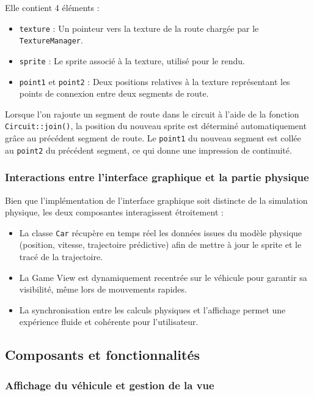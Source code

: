 Elle contient 4 éléments :
\begin{itemize}
    \item \texttt{texture} : Un pointeur vers la texture de la route chargée par le \texttt{TextureManager}.
    \item \texttt{sprite} : Le sprite associé à la texture, utilisé pour le rendu. %
    \item \texttt{point1} et \texttt{point2} : Deux positions relatives à la texture représentant les points de connexion entre deux segments de route.
\end{itemize}

Lorsque l'on rajoute un segment de route dans le circuit à l'aide de la fonction \texttt{Circuit::join()}, la position du nouveau sprite est déterminé automatiquement grâce au précédent segment de route.
Le \texttt{point1} du nouveau segment est collée au \texttt{point2} du précédent segment, ce qui donne une impression de continuité.

\subsubsection{Interactions entre l'interface graphique et la partie physique}\label{subsubsec:interactions-entre-l-interface-graphique-et-la-partie-physique}
Bien que l'implémentation de l'interface graphique soit distincte de la simulation physique, les deux composantes interagissent étroitement :
\begin{itemize}
    \item La classe \texttt{Car} récupère en temps réel les données issues du modèle physique (position, vitesse, trajectoire prédictive) afin de mettre à jour le sprite et le tracé de la trajectoire.
    \item La Game View est dynamiquement recentrée sur le véhicule pour garantir sa visibilité, même lors de mouvements rapides.
    \item La synchronisation entre les calculs physiques et l'affichage permet une expérience fluide et cohérente pour l'utilisateur.
\end{itemize}

\subsection{Composants et fonctionnalités}\label{subsec:composants-et-fonctionnalites}

\subsubsection{Affichage du véhicule et gestion de la vue}\label{subsubsec:affichage-du-vehicule-et-gestion-de-la-vue}

